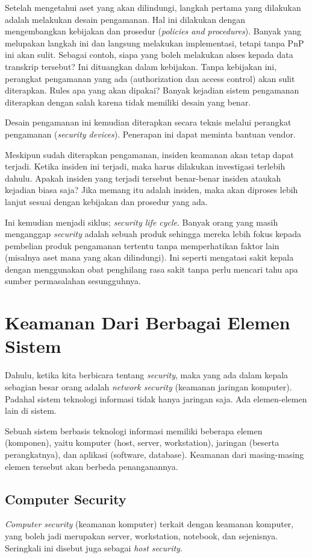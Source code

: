 Setelah mengetahui aset yang akan dilindungi, langkah pertama yang dilakukan
adalah melakukan desain pengamanan. Hal ini dilakukan dengan mengembangkan
kebijakan dan prosedur ({\em policies and procedures}). Banyak yang melupakan
langkah ini dan langsung melakukan implementasi, tetapi tanpa PnP ini akan
sulit. Sebagai contoh, siapa yang boleh melakukan akses kepada data transkrip
tersebut? Ini dituangkan dalam kebijakan. Tanpa kebijakan ini, perangkat
pengamanan yang ada (authorization dan access control) akan sulit diterapkan.
Rules apa yang akan dipakai? Banyak kejadian sistem pengamanan diterapkan
dengan salah karena tidak memiliki desain yang benar.

Desain pengamanan ini kemudian diterapkan secara teknis melalui perangkat
pengamanan ({\em security devices}). Penerapan ini dapat meminta bantuan
vendor. 

Meskipun sudah diterapkan pengamanan, insiden keamanan akan tetap dapat
terjadi. Ketika insiden ini terjadi, maka harus dilakukan investigasi terlebih
dahulu. Apakah insiden yang terjadi tersebut benar-benar insiden ataukah
kejadian biasa saja? Jika memang itu adalah insiden, maka akan diproses lebih
lanjut sesuai dengan kebijakan dan prosedur yang ada.

Ini kemudian menjadi siklus; {\em security life cycle}. Banyak orang yang masih
menganggap {\em security} adalah sebuah produk sehingga mereka lebih fokus
kepada pembelian produk pengamanan tertentu tanpa memperhatikan faktor lain
(misalnya aset mana yang akan dilindungi). Ini seperti mengatasi sakit kepala
dengan menggunakan obat penghilang rasa sakit tanpa perlu mencari tahu apa
sumber permasalahan sesungguhnya.


\section{Keamanan Dari Berbagai Elemen Sistem}
Dahulu, ketika kita berbicara tentang {\em security}, maka yang ada dalam
kepala sebagian besar orang adalah {\em network security} (keamanan jaringan
komputer). Padahal sistem teknologi informasi tidak hanya jaringan saja. Ada
elemen-elemen lain di sistem.

Sebuah sistem berbasis teknologi informasi memiliki beberapa elemen (komponen),
yaitu komputer (host, server, workstation), jaringan (beserta perangkatnya),
dan aplikasi (software, database). Keamanan dari masing-masing elemen tersebut
akan berbeda penanganannya.

\subsection{Computer Security}
{\em Computer security} (keamanan komputer) terkait dengan keamanan komputer,
yang boleh jadi merupakan server, workstation, notebook, dan sejenisnya.
Seringkali ini disebut juga sebagai {\em host security}.

